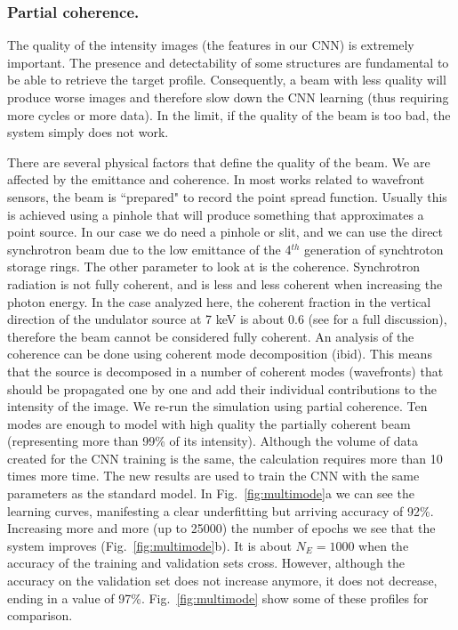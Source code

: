 \documentclass{iucr}
\begin{document}


\subsubsection{Partial coherence.}
The quality of the intensity images (the features in our CNN) is extremely important. The presence and detectability of some structures are fundamental to be able to retrieve the target profile. Consequently, a beam with less quality will produce worse images and therefore slow down the CNN learning (thus requiring more cycles or more data). In the limit, if the quality of the beam is too bad, the system simply does not work.  

There are several physical factors that define the quality of the beam. We are affected by the emittance and coherence. In most works related to wavefront sensors, the beam is ``prepared" to record the point spread function. Usually this is achieved using a pinhole that will produce something that approximates a point source. In our case we do need a pinhole or slit, and we can use the direct synchrotron beam due to the low emittance of the 4$^{th}$ generation of synchtroton storage rings. The other parameter to look at is the coherence. Synchrotron radiation is not fully coherent, and is less and less coherent when increasing the photon energy. In the case analyzed here, the coherent fraction in the vertical direction of the undulator source at 7 keV is about 0.6 (see \cite{SanchezdelRio:ay5600} for a full discussion), therefore the beam cannot be considered fully coherent. An analysis of the coherence can be done using coherent mode decomposition (ibid). This means that the source is decomposed in a number of coherent modes (wavefronts) that should be propagated one by one and add their individual contributions to the intensity of the image. We re-run the simulation using partial coherence. Ten modes are enough to model with high quality the partially coherent beam (representing more than 99\% of its intensity). Although the volume of data created for the CNN training is the same, the calculation requires more than 10 times more time. The new results are used to train the CNN with the same parameters as the standard model. In Fig.~\ref{fig:multimode}a we can see the learning curves, manifesting a clear underfitting but arriving accuracy of 92\%. Increasing more and more (up to 25000) the number of epochs we see that the system improves (Fig.~\ref{fig:multimode}b). It is about $N_E=1000$ when the accuracy of the training and validation sets cross. However, although the accuracy on the validation set does not increase anymore, it does not decrease, ending in a value of 97\%. Fig.~\ref{fig:multimode} show some of these profiles for comparison.
\end{document}
